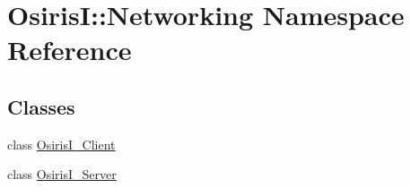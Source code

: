 \hypertarget{namespace_osiris_i_1_1_networking}{\section{Osiris\-I\-:\-:Networking Namespace Reference}
\label{namespace_osiris_i_1_1_networking}
}
\subsection*{Classes}
\begin{DoxyCompactItemize}
\item 
class \hyperlink{class_osiris_i_1_1_networking_1_1_osiris_i___client}{Osiris\-I\-\_\-\-Client}
\item 
class \hyperlink{class_osiris_i_1_1_networking_1_1_osiris_i___server}{Osiris\-I\-\_\-\-Server}
\end{DoxyCompactItemize}
